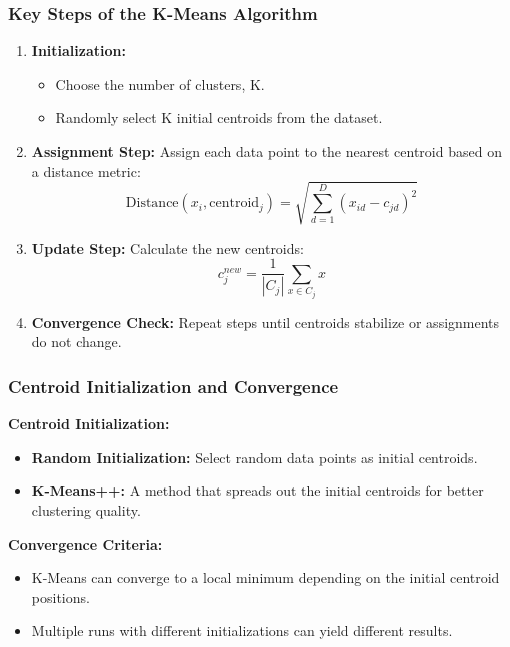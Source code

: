 \documentclass[aspectratio=169]{beamer}
\begin{document}
\begin{frame}[fragile]
    \frametitle{Key Steps of the K-Means Algorithm}
    \begin{enumerate}
        \item \textbf{Initialization:}
        \begin{itemize}
            \item Choose the number of clusters, K.
            \item Randomly select K initial centroids from the dataset.
        \end{itemize}
        
        \item \textbf{Assignment Step:} Assign each data point to the nearest centroid based on a distance metric: 
        \begin{equation}
            \text{Distance}(x_i, \text{centroid}_j) = \sqrt{\sum_{d=1}^{D} (x_{id} - c_{jd})^2}
        \end{equation}

        \item \textbf{Update Step:} Calculate the new centroids:
        \begin{equation}
            c_{j}^{new} = \frac{1}{|C_j|} \sum_{x \in C_j} x
        \end{equation}

        \item \textbf{Convergence Check:} Repeat steps until centroids stabilize or assignments do not change.
    \end{enumerate}
\end{frame}

\begin{frame}[fragile]
    \frametitle{Centroid Initialization and Convergence}
    \textbf{Centroid Initialization:}
    \begin{itemize}
        \item \textbf{Random Initialization:} Select random data points as initial centroids.
        \item \textbf{K-Means++:} A method that spreads out the initial centroids for better clustering quality.
    \end{itemize}

    \textbf{Convergence Criteria:} 
    \begin{itemize}
        \item K-Means can converge to a local minimum depending on the initial centroid positions.
        \item Multiple runs with different initializations can yield different results.
    \end{itemize}
\end{frame}
\end{document}

